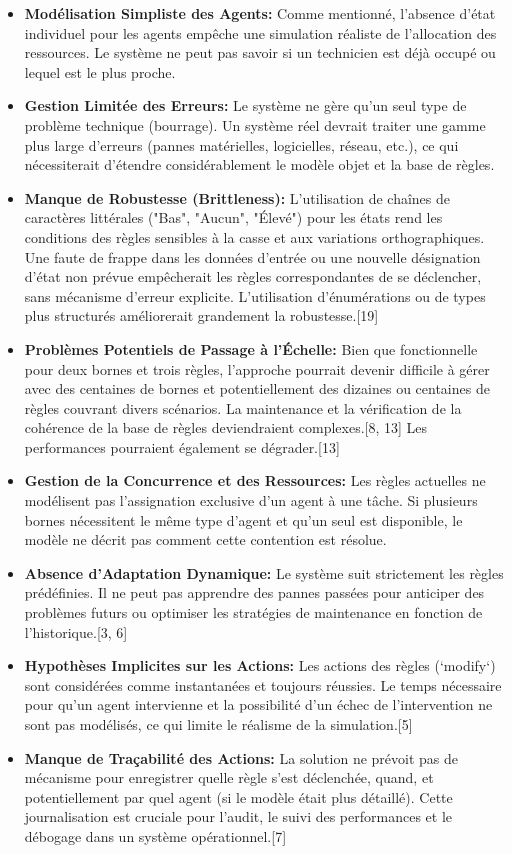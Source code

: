 \documentclass[11pt,a4paper]{article}
\begin{document}
\begin{itemize}
    \item \textbf{Modélisation Simpliste des Agents:} Comme mentionné, l'absence d'état individuel pour les agents empêche une simulation réaliste de l'allocation des ressources. Le système ne peut pas savoir si un technicien est déjà occupé ou lequel est le plus proche.
    \item \textbf{Gestion Limitée des Erreurs:} Le système ne gère qu'un seul type de problème technique (bourrage). Un système réel devrait traiter une gamme plus large d'erreurs (pannes matérielles, logicielles, réseau, etc.), ce qui nécessiterait d'étendre considérablement le modèle objet et la base de règles.
    \item \textbf{Manque de Robustesse (Brittleness):} L'utilisation de chaînes de caractères littérales ("Bas", "Aucun", "Élevé") pour les états rend les conditions des règles sensibles à la casse et aux variations orthographiques. Une faute de frappe dans les données d'entrée ou une nouvelle désignation d'état non prévue empêcherait les règles correspondantes de se déclencher, sans mécanisme d'erreur explicite. L'utilisation d'énumérations ou de types plus structurés améliorerait grandement la robustesse.[19]
    \item \textbf{Problèmes Potentiels de Passage à l'Échelle:} Bien que fonctionnelle pour deux bornes et trois règles, l'approche pourrait devenir difficile à gérer avec des centaines de bornes et potentiellement des dizaines ou centaines de règles couvrant divers scénarios. La maintenance et la vérification de la cohérence de la base de règles deviendraient complexes.[8, 13] Les performances pourraient également se dégrader.[13]
    \item \textbf{Gestion de la Concurrence et des Ressources:} Les règles actuelles ne modélisent pas l'assignation exclusive d'un agent à une tâche. Si plusieurs bornes nécessitent le même type d'agent et qu'un seul est disponible, le modèle ne décrit pas comment cette contention est résolue.
    \item \textbf{Absence d'Adaptation Dynamique:} Le système suit strictement les règles prédéfinies. Il ne peut pas apprendre des pannes passées pour anticiper des problèmes futurs ou optimiser les stratégies de maintenance en fonction de l'historique.[3, 6]
    \item \textbf{Hypothèses Implicites sur les Actions:} Les actions des règles (`modify`) sont considérées comme instantanées et toujours réussies. Le temps nécessaire pour qu'un agent intervienne et la possibilité d'un échec de l'intervention ne sont pas modélisés, ce qui limite le réalisme de la simulation.[5]
    \item \textbf{Manque de Traçabilité des Actions:} La solution ne prévoit pas de mécanisme pour enregistrer quelle règle s'est déclenchée, quand, et potentiellement par quel agent (si le modèle était plus détaillé). Cette journalisation est cruciale pour l'audit, le suivi des performances et le débogage dans un système opérationnel.[7]
\end{itemize}
\end{document}
